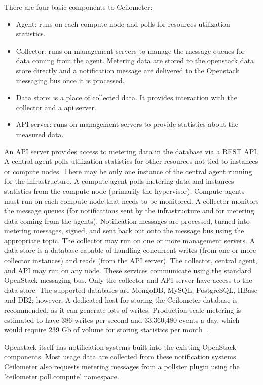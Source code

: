 \documentclass{sig-alternate-05-2015}
\begin{document}
There are four basic components to Ceilometer:

\begin{itemize}
  \item Agent: runs on each compute node and polls for resources utilization statistics.
  \item Collector: runs on management servers to manage the message queues for data coming from the agent. Metering data are stored to the openstack data store directly and a notification message are delivered to the Openstack messaging bus once it is processed.
  \item Data store: is a place of collected data. It provides interaction with the collector and a api server.
  \item API server: runs on management servers to provide statistics about the measured data.
\end{itemize}

An API server provides access to metering data in the database via a REST API. A central agent polls utilization statistics for other resources not tied to instances or compute nodes. There may be only one instance of the central agent running for the infrastructure. A compute agent polls metering data and instances statistics from the compute node (primarily the hypervisor). Compute agents must run on each compute node that needs to be monitored. A collector monitors the message queues (for notifications sent by the infrastructure and for metering data coming from the agents). Notification messages are processed, turned into metering messages, signed, and sent back out onto the message bus using the appropriate topic. The collector may run on one or more management servers. A data store is a database capable of handling concurrent writes (from one or more collector instances) and reads (from the API server). The collector, central agent, and API may run on any node. These services communicate using the standard OpenStack messaging bus. Only the collector and API server have access to the data store. The supported databases are MongoDB, MySQL, PostgreSQL, HBase and DB2; however, A dedicated host for storing the Ceilometer database is recommended, as it can generate lots of writes. Production scale metering is estimated to have 386 writes per second and 33,360,480 events a day, which would require 239 Gb of volume for storing statistics per month~\cite{Barcet12}.

Openstack itself has notification systems built into the existing OpenStack components. Most usage data are collected from these notification systems. Ceilometer also requests metering messages from a pollster plugin using the 'ceilometer.poll.compute' namespace.
\end{document}
